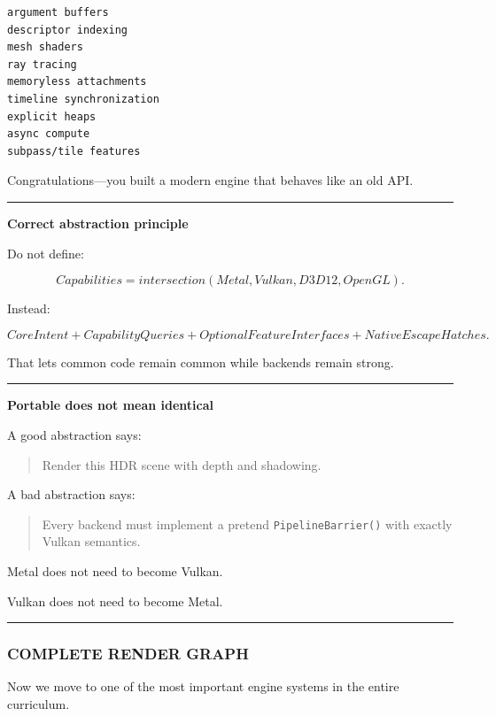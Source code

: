 \begin{verbatim}
argument buffers
descriptor indexing
mesh shaders
ray tracing
memoryless attachments
timeline synchronization
explicit heaps
async compute
subpass/tile features
\end{verbatim}

Congratulations---you built a modern engine that behaves like an old API.

\begin{center}\rule{0.5\linewidth}{0.5pt}\end{center}

\textbf{Correct abstraction principle}

Do not define:

\[
\boxed{
Capabilities=
intersection(
Metal,
Vulkan,
D3D12,
OpenGL).
}
\]

Instead:

\[
\boxed{
CoreIntent
+
CapabilityQueries
+
OptionalFeatureInterfaces
+
NativeEscapeHatches.
}
\]

That lets common code remain common while backends remain strong.

\begin{center}\rule{0.5\linewidth}{0.5pt}\end{center}

\textbf{Portable does not mean identical}

A good abstraction says:

\begin{quote}
Render this HDR scene with depth and shadowing.
\end{quote}

A bad abstraction says:

\begin{quote}
Every backend must implement a pretend \texttt{PipelineBarrier()} with exactly Vulkan semantics.
\end{quote}

Metal does not need to become Vulkan.

Vulkan does not need to become Metal.

\begin{center}\rule{0.5\linewidth}{0.5pt}\end{center}

\subsubsection{COMPLETE RENDER GRAPH}\label{complete-render-graph}

Now we move to one of the most important engine systems in the entire curriculum.

